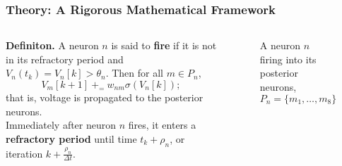 \documentclass{beamer}
\newcommand*{\Scale}[2][4]{\scalebox{#1}{$#2$}}%
\begin{document}
    \begin{frame}
    \frametitle{Theory: A Rigorous Mathematical Framework} 

    \begin{columns}
      \begin{column}{0.7\textwidth}
\textbf{Definiton. }
  A neuron $n$ is said to \textbf{fire} if it is not in its refractory period and $V_n(t_{k}) = V_n[k] > \theta_n$. Then for all $m \in P_n$,
  \begin{equation*}
    V_m[k+1] {\ +_=\ } w_{nm} \sigma(V_n[k]); \label{eq:fire}
  \end{equation*}
  that is, voltage is propagated to the posterior neurons.  \\[0.5cm]

  Immediately after neuron $n$ fires, it enters  a \textbf{refractory period} until time $t_{k} + \rho_n$, or iteration $k + \frac{\rho_n}{\Delta t}$. 

      \end{column}
      \begin{column}{0.3\textwidth}
      \begin{figure}
          \begin{centering}

          \end{centering}
          \caption{A neuron $n$ firing  into its posterior neurons, $P_n = \{m_1, \dots, m_8\}$}
      \end{figure}
      
      \end{column}
    \end{columns}
    \end{frame}
\end{document}
